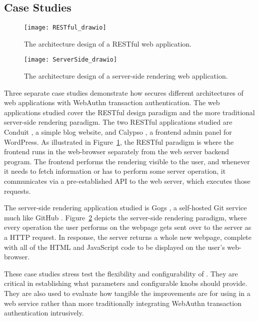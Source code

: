 \subsection{Case Studies}

\begin{figure}[h]
  \centering
  \texttt{[image: RESTful\_drawio]}
  \caption{The architecture design of a RESTful web application.}
  \label{Fig:CaseStudiesRESTful}
\end{figure}

\begin{figure}[h]
  \centering
  \texttt{[image: ServerSide\_drawio]}
  \caption{The architecture design of a server-side rendering web application.}
  \label{Fig:CaseStudiesServerSide}
\end{figure}

Three separate case studies demonstrate how \sys{} secures different architectures of web applications with WebAuthn transaction authentication. The web applications studied cover the RESTful design paradigm and the more traditional server-side rendering paradigm. The two RESTful applications studied are Conduit \cite{conduit}, a simple blog website, and Calypso \cite{calypso}, a frontend admin panel for WordPress. As illustrated in Figure~\ref{Fig:CaseStudiesRESTful}, the RESTful paradigm is where the frontend runs in the web-browser separately from the web server backend program. The frontend performs the rendering visible to the user, and whenever it needs to fetch information or has to perform some server operation, it communicates via a pre-established API to the web server, which executes those requests. 

The server-side rendering application studied is Gogs \cite{gogs}, a self-hosted Git service much like GitHub \cite{github}. Figure~\ref{Fig:CaseStudiesServerSide} depicts the server-side rendering paradigm, where every operation the user performs on the webpage gets sent over to the server as a HTTP request. In response, the server returns a whole new webpage, complete with all of the HTML and JavaScript code to be displayed on the user's web-browser.


These case studies stress test the flexibility and configurability of \sys{}. They are critical in establishing what parameters and configurable knobs \sys{} should provide. They are also used to evaluate how tangible the improvements are for using \sys{} in a web service rather than more traditionally integrating WebAuthn transaction authentication intrusively. 

